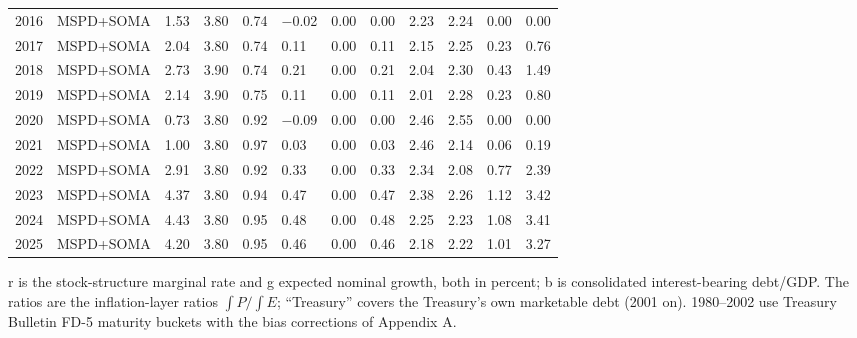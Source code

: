 {\begin{longtable}{llllllllllll}
2016 & MSPD+SOMA & 1.53 & 3.80 & 0.74 & $-$0.02 & 0.00 & 0.00 & 2.23 & 2.24 & 0.00 & 0.00 \\
2017 & MSPD+SOMA & 2.04 & 3.80 & 0.74 & 0.11 & 0.00 & 0.11 & 2.15 & 2.25 & 0.23 & 0.76 \\
2018 & MSPD+SOMA & 2.73 & 3.90 & 0.74 & 0.21 & 0.00 & 0.21 & 2.04 & 2.30 & 0.43 & 1.49 \\
2019 & MSPD+SOMA & 2.14 & 3.90 & 0.75 & 0.11 & 0.00 & 0.11 & 2.01 & 2.28 & 0.23 & 0.80 \\
2020 & MSPD+SOMA & 0.73 & 3.80 & 0.92 & $-$0.09 & 0.00 & 0.00 & 2.46 & 2.55 & 0.00 & 0.00 \\
2021 & MSPD+SOMA & 1.00 & 3.80 & 0.97 & 0.03 & 0.00 & 0.03 & 2.46 & 2.14 & 0.06 & 0.19 \\
2022 & MSPD+SOMA & 2.91 & 3.80 & 0.92 & 0.33 & 0.00 & 0.33 & 2.34 & 2.08 & 0.77 & 2.39 \\
2023 & MSPD+SOMA & 4.37 & 3.80 & 0.94 & 0.47 & 0.00 & 0.47 & 2.38 & 2.26 & 1.12 & 3.42 \\
2024 & MSPD+SOMA & 4.43 & 3.80 & 0.95 & 0.48 & 0.00 & 0.48 & 2.25 & 2.23 & 1.08 & 3.41 \\
2025 & MSPD+SOMA & 4.20 & 3.80 & 0.95 & 0.46 & 0.00 & 0.46 & 2.18 & 2.22 & 1.01 & 3.27 \\
\bottomrule
\end{longtable}}
{\footnotesize r is the stock-structure marginal rate and g expected nominal growth, both in percent; b is consolidated interest-bearing debt/GDP. The ratios are the inflation-layer ratios $\int P/\int E$; ``Treasury'' covers the Treasury's own marketable debt (2001 on). 1980–2002 use Treasury Bulletin FD-5 maturity buckets with the bias corrections of Appendix A.}
